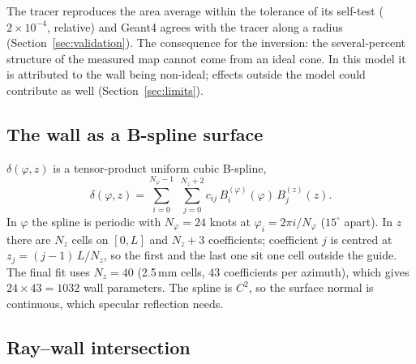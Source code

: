 \documentclass[11pt,a4paper]{article}
\begin{document}
The tracer reproduces the area average within the tolerance of its self-test ($2\times10^{-4}$,
relative) and Geant4 agrees with the tracer along a radius (Section~\ref{sec:validation}). The
consequence for the inversion: the several-percent structure of the measured map cannot come from an
ideal cone. In this model it is attributed to the wall being non-ideal; effects outside the model
could contribute as well (Section~\ref{sec:limits}).

\subsection{The wall as a B-spline surface}

$\delta(\varphi,z)$ is a tensor-product uniform cubic B-spline,
\[
  \delta(\varphi,z) = \sum_{i=0}^{N_\varphi-1}\;\sum_{j=0}^{N_z+2} c_{ij}\,B_i^{(\varphi)}(\varphi)\,B_j^{(z)}(z).
\]
In $\varphi$ the spline is periodic with $N_\varphi=24$ knots at $\varphi_i = 2\pi i/N_\varphi$
($15^\circ$ apart). In $z$ there are $N_z$ cells on $[0,L]$ and $N_z+3$ coefficients; coefficient $j$
is centred at $z_j=(j-1)\,L/N_z$, so the first and the last one sit one cell outside the guide. The
final fit uses $N_z=40$ (2.5\,mm cells, 43 coefficients per azimuth), which gives $24\times43=1032$
wall parameters. The spline is $C^2$, so the surface normal is continuous, which specular reflection
needs.

\subsection{Ray--wall intersection}
\label{sec:intersection}
\end{document}
